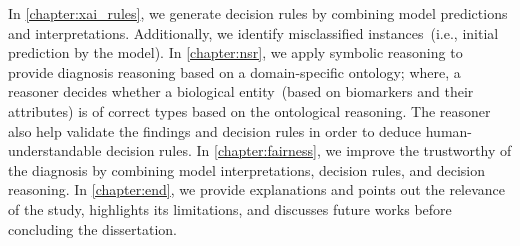 \hspace*{3.5mm} In \cref{chapter:xai_rules}, we generate decision rules by combining model predictions and interpretations. Additionally, we identify  misclassified instances~(i.e., initial prediction by the model). In \cref{chapter:nsr}, we apply symbolic reasoning to provide diagnosis reasoning based on a domain-specific ontology; where, a reasoner decides whether a biological entity~(based on biomarkers and their attributes) is of correct types based on the ontological reasoning. The reasoner also help validate the findings and decision rules in order to deduce human-understandable decision rules. In \cref{chapter:fairness}, we improve the trustworthy of the diagnosis by combining model interpretations, decision rules, and decision reasoning. In \cref{chapter:end}, we provide explanations and points out the relevance of the study, highlights its limitations, and discusses future works before concluding the dissertation. 

